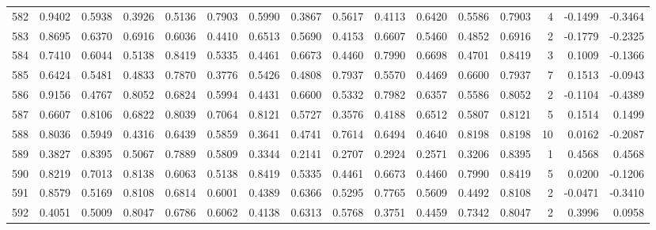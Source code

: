 \begin{tabular}{lrrrrrrrrrrrrrrr}
582 &      0.9402 &  0.5938 &  0.3926 &  0.5136 &  0.7903 &  0.5990 &  0.3867 &  0.5617 &  0.4113 &  0.6420 &   0.5586 &     0.7903 &      4 &                   -0.1499 &                    -0.3464 \\
583 &      0.8695 &  0.6370 &  0.6916 &  0.6036 &  0.4410 &  0.6513 &  0.5690 &  0.4153 &  0.6607 &  0.5460 &   0.4852 &     0.6916 &      2 &                   -0.1779 &                    -0.2325 \\
584 &      0.7410 &  0.6044 &  0.5138 &  0.8419 &  0.5335 &  0.4461 &  0.6673 &  0.4460 &  0.7990 &  0.6698 &   0.4701 &     0.8419 &      3 &                    0.1009 &                    -0.1366 \\
585 &      0.6424 &  0.5481 &  0.4833 &  0.7870 &  0.3776 &  0.5426 &  0.4808 &  0.7937 &  0.5570 &  0.4469 &   0.6600 &     0.7937 &      7 &                    0.1513 &                    -0.0943 \\
586 &      0.9156 &  0.4767 &  0.8052 &  0.6824 &  0.5994 &  0.4431 &  0.6600 &  0.5332 &  0.7982 &  0.6357 &   0.5586 &     0.8052 &      2 &                   -0.1104 &                    -0.4389 \\
587 &      0.6607 &  0.8106 &  0.6822 &  0.8039 &  0.7064 &  0.8121 &  0.5727 &  0.3576 &  0.4188 &  0.6512 &   0.5807 &     0.8121 &      5 &                    0.1514 &                     0.1499 \\
588 &      0.8036 &  0.5949 &  0.4316 &  0.6439 &  0.5859 &  0.3641 &  0.4741 &  0.7614 &  0.6494 &  0.4640 &   0.8198 &     0.8198 &     10 &                    0.0162 &                    -0.2087 \\
589 &      0.3827 &  0.8395 &  0.5067 &  0.7889 &  0.5809 &  0.3344 &  0.2141 &  0.2707 &  0.2924 &  0.2571 &   0.3206 &     0.8395 &      1 &                    0.4568 &                     0.4568 \\
590 &      0.8219 &  0.7013 &  0.8138 &  0.6063 &  0.5138 &  0.8419 &  0.5335 &  0.4461 &  0.6673 &  0.4460 &   0.7990 &     0.8419 &      5 &                    0.0200 &                    -0.1206 \\
591 &      0.8579 &  0.5169 &  0.8108 &  0.6814 &  0.6001 &  0.4389 &  0.6366 &  0.5295 &  0.7765 &  0.5609 &   0.4492 &     0.8108 &      2 &                   -0.0471 &                    -0.3410 \\
592 &      0.4051 &  0.5009 &  0.8047 &  0.6786 &  0.6062 &  0.4138 &  0.6313 &  0.5768 &  0.3751 &  0.4459 &   0.7342 &     0.8047 &      2 &                    0.3996 &                     0.0958 \\

\end{tabular}
